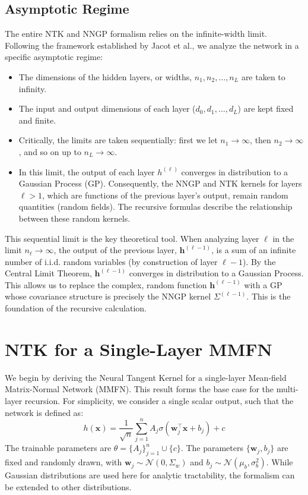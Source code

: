 \documentclass[12pt]{article}
\begin{document}
\subsection{Asymptotic Regime}
The entire NTK and NNGP formalism relies on the infinite-width limit. Following the framework established by Jacot et al., we analyze the network in a specific asymptotic regime:
\begin{itemize}
    \item The dimensions of the hidden layers, or widths, $n_1, n_2, \dots, n_L$ are taken to infinity.
    \item The input and output dimensions of each layer ($d_0, d_1, \dots, d_L$) are kept fixed and finite.
    \item Critically, the limits are taken sequentially: first we let $n_1 \to \infty$, then $n_2 \to \infty$, and so on up to $n_L \to \infty$.
    \item In this limit, the output of each layer $h^{(\ell)}$ converges in distribution to a Gaussian Process (GP). Consequently, the NNGP and NTK kernels for layers $\ell > 1$, which are functions of the previous layer's output, remain random quantities (random fields). The recursive formulas describe the relationship between these random kernels.
\end{itemize}
This sequential limit is the key theoretical tool. When analyzing layer $\ell$ in the limit $n_\ell \to \infty$, the output of the previous layer, $\bm{h}^{(\ell-1)}$, is a sum of an infinite number of i.i.d. random variables (by construction of layer $\ell-1$). By the Central Limit Theorem, $\bm{h}^{(\ell-1)}$ converges in distribution to a Gaussian Process. This allows us to replace the complex, random function $\bm{h}^{(\ell-1)}$ with a GP whose covariance structure is precisely the NNGP kernel $\Sigma^{(\ell-1)}$. This is the foundation of the recursive calculation.

\section{NTK for a Single-Layer MMFN}
\label{sec:single_layer_mmfn}
We begin by deriving the Neural Tangent Kernel for a single-layer Mean-field Matrix-Normal Network (MMFN). This result forms the base case for the multi-layer recursion. For simplicity, we consider a single scalar output, such that the network is defined as:
\begin{equation}
    h(\bm{x}) = \frac{1}{\sqrt{n}} \sum_{j=1}^n A_j \sigma(\bm{w}_j^\top \bm{x} + b_j) + c
\end{equation}
The trainable parameters are $\theta = \{A_j\}_{j=1}^n \cup \{c\}$. The parameters $\{\bm{w}_j, b_j\}$ are fixed and randomly drawn, with $\bm{w}_j \sim \mathcal{N}(0, \Sigma_w)$ and $b_j \sim \mathcal{N}(\mu_b, \sigma_b^2)$. While Gaussian distributions are used here for analytic tractability, the formalism can be extended to other distributions.
\end{document}
